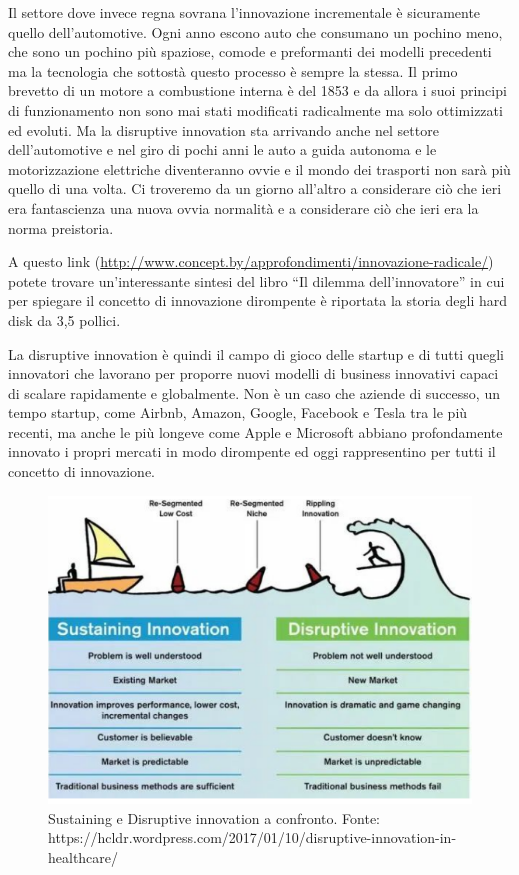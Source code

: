 Il settore dove invece regna sovrana l'innovazione incrementale è sicuramente quello dell'automotive. Ogni anno escono auto che consumano un pochino meno, che sono un pochino più spaziose, comode e preformanti dei modelli precedenti ma la tecnologia che sottostà questo processo è sempre la stessa. Il primo brevetto di un motore a combustione interna è del 1853 e da allora i suoi principi di funzionamento non sono mai stati modificati radicalmente ma solo ottimizzati ed evoluti.
Ma la disruptive innovation sta arrivando anche nel settore dell'automotive e nel giro di pochi anni le auto a guida autonoma e le motorizzazione elettriche diventeranno ovvie e il mondo dei trasporti non sarà più quello di una volta. Ci troveremo da un giorno all'altro a considerare ciò che ieri era fantascienza una nuova ovvia normalità e a considerare ciò che ieri era la norma preistoria.

A questo link (\url{http://www.concept.by/approfondimenti/innovazione-radicale/}) potete trovare un'interessante sintesi del libro ``Il dilemma dell'innovatore'' in cui per spiegare il concetto di innovazione dirompente è riportata la storia degli hard disk da 3,5 pollici.

La disruptive innovation è quindi il campo di gioco delle startup e di tutti quegli innovatori che lavorano per proporre nuovi modelli di business innovativi capaci di scalare rapidamente e globalmente. Non è un caso che aziende di successo, un tempo startup, come Airbnb, Amazon, Google, Facebook e Tesla tra le più recenti, ma anche le più longeve come Apple e Microsoft abbiano profondamente innovato i propri mercati in modo dirompente ed oggi rappresentino per tutti il concetto di innovazione. 

\begin{figure}[!h]
	\centering
	\includegraphics[width=\textwidth]{"immagini/Disruptive Innovation"}
		\caption{Sustaining e Disruptive innovation a confronto. Fonte: https://hcldr.wordpress.com/2017/01/10/disruptive-innovation-in-healthcare/}
\end{figure}


